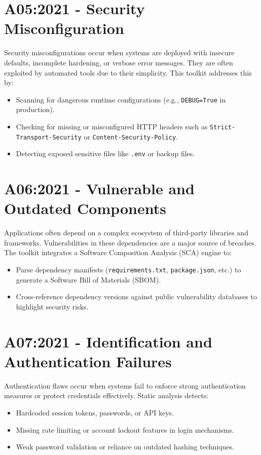 \section{A05:2021 - Security Misconfiguration}
Security misconfigurations occur when systems are deployed with insecure defaults, incomplete hardening, or verbose error messages. They are often exploited by automated tools due to their simplicity.  
This toolkit addresses this by:
\begin{itemize}
    \item Scanning for dangerous runtime configurations (e.g., \texttt{DEBUG=True} in production).
    \item Checking for missing or misconfigured HTTP headers such as \texttt{Strict-Transport-Security} or \texttt{Content-Security-Policy}.
    \item Detecting exposed sensitive files like \texttt{.env} or backup files.
\end{itemize}

\section{A06:2021 - Vulnerable and Outdated Components}
Applications often depend on a complex ecosystem of third-party libraries and frameworks. Vulnerabilities in these dependencies are a major source of breaches.
The toolkit integrates a Software Composition Analysis (SCA) engine to:
\begin{itemize}
    \item Parse dependency manifests (\texttt{requirements.txt}, \texttt{package.json}, etc.) to generate a Software Bill of Materials (SBOM).
    \item Cross-reference dependency versions against public vulnerability databases to highlight security risks.
\end{itemize}

\section{A07:2021 - Identification and Authentication Failures}
Authentication flaws occur when systems fail to enforce strong authentication measures or protect credentials effectively.  
Static analysis detects:
\begin{itemize}
    \item Hardcoded session tokens, passwords, or API keys.
    \item Missing rate limiting or account lockout features in login mechanisms.
    \item Weak password validation or reliance on outdated hashing techniques.
\end{itemize}

